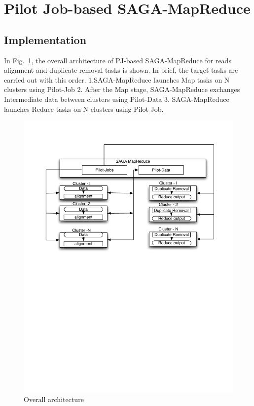 \documentclass{sig-alternate}
\begin{document}
\section{Pilot Job-based SAGA-MapReduce}

\subsection{Implementation}
In Fig.~\ref{fig:arch-pj-saga-mr}, the overall architecture of PJ-based SAGA-MapReduce for reads alignment and duplicate removal tasks is shown.  In brief, the target tasks are carried out with this order. 1.SAGA-MapReduce launches Map tasks on N clusters using Pilot-Job 2. After the Map stage, SAGA-MapReduce exchanges Intermediate data between clusters using Pilot-Data  3. SAGA-MapReduce launches Reduce tasks on N clusters using Pilot-Job.


\begin{figure}
 \centering
\includegraphics[scale=0.45]{figures/align-dup.pdf} 

\caption{\small Overall architecture}
  \label{fig:arch-pj-saga-mr} 
\end{figure}
\end{document}
